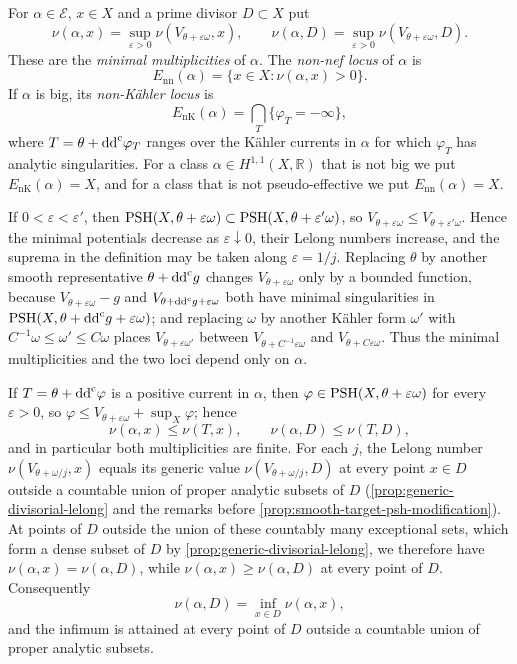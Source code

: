 \begin{definition}\label{def:minimal-class-multiplicities}
For $\alpha\in\mathcal E$, $x\in X$ and a prime divisor $D\subset X$ put
\[
 \nu(\alpha,x)=\sup_{\varepsilon>0}\nu(V_{\theta+\varepsilon\omega},x),
 \qquad
 \nu(\alpha,D)=\sup_{\varepsilon>0}\nu(V_{\theta+\varepsilon\omega},D).
\]
These are the \emph{minimal multiplicities} of $\alpha$. The \emph{non-nef locus} of $\alpha$ is
\[
 E_{\mathrm{nn}}(\alpha)=\{x\in X:\nu(\alpha,x)>0\}.
\]
If $\alpha$ is big, its \emph{non-K\"ahler locus} is
\[
 E_{\mathrm{nK}}(\alpha)=\bigcap_T\{\varphi_T=-\infty\},
\]
where $T=\theta+\mathrm{dd}^{\mathrm{c}}\varphi_T$ ranges over the K\"ahler currents in $\alpha$ for which $\varphi_T$ has analytic singularities. For a class $\alpha\in H^{1,1}(X,\mathbb R)$ that is not big we put $E_{\mathrm{nK}}(\alpha)=X$, and for a class that is not pseudo-effective we put $E_{\mathrm{nn}}(\alpha)=X$.
\end{definition}
If $0<\varepsilon<\varepsilon'$, then $\mathrm{PSH}(X,\theta+\varepsilon\omega)\subset\mathrm{PSH}(X,\theta+\varepsilon'\omega)$, so $V_{\theta+\varepsilon\omega}\leq V_{\theta+\varepsilon'\omega}$. Hence the minimal potentials decrease as $\varepsilon\downarrow0$, their Lelong numbers increase, and the suprema in the definition may be taken along $\varepsilon=1/j$. Replacing $\theta$ by another smooth representative $\theta+\mathrm{dd}^{\mathrm{c}} g$ changes $V_{\theta+\varepsilon\omega}$ only by a bounded function, because $V_{\theta+\varepsilon\omega}-g$ and $V_{\theta+\mathrm{dd}^{\mathrm{c}} g+\varepsilon\omega}$ both have minimal singularities in $\mathrm{PSH}(X,\theta+\mathrm{dd}^{\mathrm{c}} g+\varepsilon\omega)$; and replacing $\omega$ by another K\"ahler form $\omega'$ with $C^{-1}\omega\leq\omega'\leq C\omega$ places $V_{\theta+\varepsilon\omega'}$ between $V_{\theta+C^{-1}\varepsilon\omega}$ and $V_{\theta+C\varepsilon\omega}$. Thus the minimal multiplicities and the two loci depend only on $\alpha$.

If $T=\theta+\mathrm{dd}^{\mathrm{c}}\varphi$ is a positive current in $\alpha$, then $\varphi\in\mathrm{PSH}(X,\theta+\varepsilon\omega)$ for every $\varepsilon>0$, so $\varphi\leq V_{\theta+\varepsilon\omega}+\sup_X\varphi$; hence
\[
 \nu(\alpha,x)\leq\nu(T,x),\qquad\nu(\alpha,D)\leq\nu(T,D),
\]
and in particular both multiplicities are finite. For each $j$, the Lelong number $\nu(V_{\theta+\omega/j},x)$ equals its generic value $\nu(V_{\theta+\omega/j},D)$ at every point $x\in D$ outside a countable union of proper analytic subsets of $D$ (\cref{prop:generic-divisorial-lelong} and the remarks before \cref{prop:smooth-target-psh-modification}). At points of $D$ outside the union of these countably many exceptional sets, which form a dense subset of $D$ by \cref{prop:generic-divisorial-lelong}, we therefore have $\nu(\alpha,x)=\nu(\alpha,D)$, while $\nu(\alpha,x)\geq\nu(\alpha,D)$ at every point of $D$. Consequently
\[
 \nu(\alpha,D)=\inf_{x\in D}\nu(\alpha,x),
\]
and the infimum is attained at every point of $D$ outside a countable union of proper analytic subsets.

